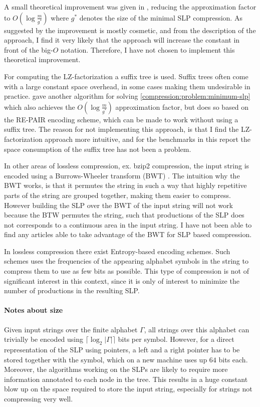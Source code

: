 \documentclass[twoside,11pt,openright]{report}
\newcommand{\ceil}[1] {\lceil #1 \rceil}
\begin{document}
A small theoretical improvement was given in \cite{Rytter2003211}, reducing the approximation factor to $O(\log{\frac{m}{g^*}})$ where $g^*$ denotes the size of the minimal SLP compression. As suggested by \cite{Rytter2003211} the improvement is mostly cosmetic, and from the description of the approach, I find it very likely that the approach will increase the constant in front of the big-$O$ notation. Therefore, I have not chosen to implement this theoretical improvement.

For computing the LZ-factorization a suffix tree is used. Suffix trees often come with a large constant space overhead, in some cases making them undesirable in practice. \cite{Sakamoto2005416} gave another algorithm for solving \cref{compression:problem:minimum-slp} which also achieves the $O(\log{\frac{m}{g^*}})$ approximation factor, but does so based on the RE-PAIR encoding scheme, which can be made to work without using a suffix tree. The reason for not implementing this approach, is that I find the LZ-factorization approach more intuitive, and for the benchmarks in this report the space consumption of the suffix tree has not been a problem.

In other areas of lossless compression, ex. bzip2 compression, the input string is encoded using a Burrows-Wheeler transform (BWT) \cite{BurrowsWheeler}. The intuition why the BWT works, is that it permutes the string in such a way that highly repetitive parts of the string are grouped together, making them easier to compress. However building the SLP over the BWT of the input string will not work because the BTW permutes the string, such that productions of the SLP does not corresponds to a continuous area in the input string. I have not been able to find any articles able to take advantage of the BWT for SLP based compression.

In lossless compression there exist Entropy-based encoding schemes. Such schemes uses the frequencies of the appearing alphabet symbols in the string to compress them to use as few bits as possible. This type of compression is not of significant interest in this context, since it is only of interest to minimize the number of productions in the resulting SLP.

\paragraph{Notes about size}
Given input strings over the finite alphabet $\Gamma$, all strings over this alphabet can trivially be encoded using $\ceil{\log_2 |\Gamma|}$ bits per symbol. However, for a direct representation of the SLP using pointers, a left and a right pointer has to be stored together with the symbol, which on a new machine uses up $64$ bits each. Moreover, the algorithms working on the SLPs are likely to require more information annotated to each node in the tree. This results in a huge constant blow up on the space required to store the input string, especially for strings not compressing very well.
\end{document}
